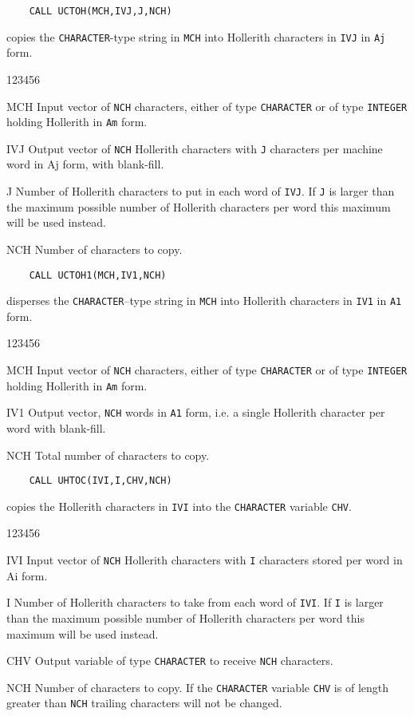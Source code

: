 \begin{verbatim}
    CALL UCTOH(MCH,IVJ,J,NCH)
\end{verbatim}
copies the {\tt CHARACTER}-type string in {\tt MCH}
into Hollerith characters in {\tt IVJ} in {\tt Aj} form.
\begin{DLtt}{123456}
\item [MCH] Input vector of {\tt NCH} characters,
either of type {\tt CHARACTER} or of type {\tt INTEGER}
holding Hollerith in {\tt Am} form.
\item [IVJ] Output vector of {\tt NCH} Hollerith characters
with {\tt J} characters per machine word in Aj form, with blank-fill.
\item [J] Number of Hollerith characters to put in each word of
{\tt IVJ}. If {\tt J} is larger than the maximum possible number of
Hollerith characters per word this maximum will be used instead.
\item [NCH] Number of characters to copy.
\end{DLtt}
\begin{verbatim}
    CALL UCTOH1(MCH,IV1,NCH)
\end{verbatim}
disperses the {\tt CHARACTER}--type string in {\tt MCH}
into Hollerith characters in {\tt IV1} in {\tt A1} form.
\begin{DLtt}{123456}
\item [MCH] Input vector of {\tt NCH} characters,
either of type {\tt CHARACTER} or of type {\tt INTEGER}
holding Hollerith in {\tt Am} form.
\item [IV1] Output vector, {\tt NCH} words in {\tt A1} form, i.e.
a single Hollerith character per word with blank-fill.
\item [NCH] Total number of characters to copy.
\end{DLtt}
\begin{verbatim}
    CALL UHTOC(IVI,I,CHV,NCH)
\end{verbatim}
copies the Hollerith characters in {\tt IVI} into the
{\tt CHARACTER} variable {\tt CHV}.
\begin{DLtt}{123456}
\item [IVI] Input vector of {\tt NCH} Hollerith characters
with {\tt I} characters stored per word in Ai form.
\item [I] Number of Hollerith characters to take from each word of
{\tt IVI}. If {\tt I} is larger than the maximum possible number of
Hollerith characters per word this maximum will be used instead.
\item [CHV] Output variable of type {\tt CHARACTER} to receive {\tt NCH}
characters.
\item [NCH] Number of characters to copy. If the
{\tt CHARACTER} variable {\tt CHV} is of length greater than {\tt NCH}
trailing characters will not be changed.
\end{DLtt}
